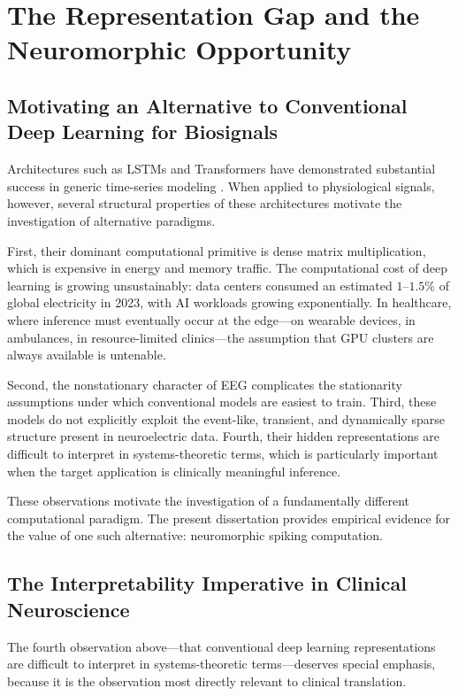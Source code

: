 \section{The Representation Gap and the Neuromorphic Opportunity}

\subsection{Motivating an Alternative to Conventional Deep Learning for Biosignals}

Architectures such as LSTMs and Transformers have demonstrated substantial success in generic time-series modeling \cite{ismail_fawaz_deep_2019}. When applied to physiological signals, however, several structural properties of these architectures motivate the investigation of alternative paradigms.

First, their dominant computational primitive is dense matrix multiplication, which is expensive in energy and memory traffic. The computational cost of deep learning is growing unsustainably: data centers consumed an estimated $1$--$1.5\%$ of global electricity in 2023, with AI workloads growing exponentially. In healthcare, where inference must eventually occur at the edge---on wearable devices, in ambulances, in resource-limited clinics---the assumption that GPU clusters are always available is untenable.

Second, the nonstationary character of EEG complicates the stationarity assumptions under which conventional models are easiest to train. Third, these models do not explicitly exploit the event-like, transient, and dynamically sparse structure present in neuroelectric data. Fourth, their hidden representations are difficult to interpret in systems-theoretic terms, which is particularly important when the target application is clinically meaningful inference.

These observations motivate the investigation of a fundamentally different computational paradigm. The present dissertation provides empirical evidence for the value of one such alternative: neuromorphic spiking computation.

\subsection{The Interpretability Imperative in Clinical Neuroscience}

The fourth observation above---that conventional deep learning representations are difficult to interpret in systems-theoretic terms---deserves special emphasis, because it is the observation most directly relevant to clinical translation.

